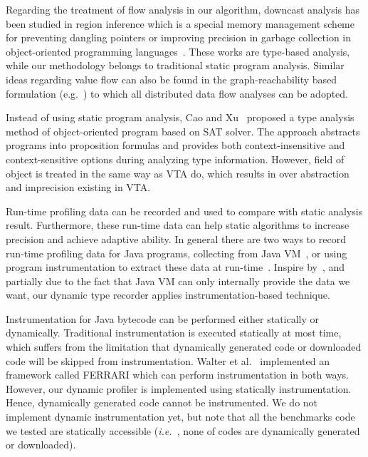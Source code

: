\documentclass{fac}
\newcommand\ie{\textit{i.e.\ }}
\begin{document}
Regarding the treatment of flow analysis in our algorithm, downcast analysis has been studied in region inference which is a special memory management scheme for preventing dangling pointers or improving precision in garbage collection in object-oriented programming languages~\cite{Boyapati2003,Chin2004}.  These works are type-based analysis, while our methodology belongs to traditional static program analysis. Similar ideas regarding value flow can also be found in the graph-reachability based formulation (e.g.~\cite{Reps1997,Lu2013}) to which all distributed data flow analyses can be adopted.

Instead of using static program analysis, Cao and Xu~\cite{Cao2009} proposed a type analysis method of object-oriented program based on SAT solver. The approach abstracts programs into proposition formulas and provides both context-insensitive and context-sensitive options during analyzing type information. However, field of object is treated in the same way as VTA do, which results in over abstraction and imprecision existing in VTA.

Run-time profiling data can be recorded and used to compare with static analysis result. Furthermore, these run-time data can help static algorithms to increase precision and achieve adaptive ability. In general there are two ways to record run-time profiling data for Java programs, collecting from Java VM~\cite{Codrut2014}, or using program instrumentation to extract these data at run-time~\cite{Sundaresan2000}. Inspire by~\cite{Sundaresan2000}, and partially due to the fact that Java VM can only internally provide the data we want, our dynamic type recorder applies instrumentation-based technique.

Instrumentation for Java bytecode can be performed either statically or dynamically. Traditional instrumentation is executed statically at most time, which suffers from the limitation that dynamically generated code or downloaded code will be skipped from instrumentation. Walter et al.~\cite{Binder2007} implemented an framework called FERRARI which can perform instrumentation in both ways. However, our dynamic profiler is implemented using statically instrumentation. Hence, dynamically generated code cannot be instrumented. We do not implement dynamic instrumentation yet, but note that all the benchmarks code we tested are statically accessible (\ie, none of codes are dynamically generated or downloaded).
\end{document}
